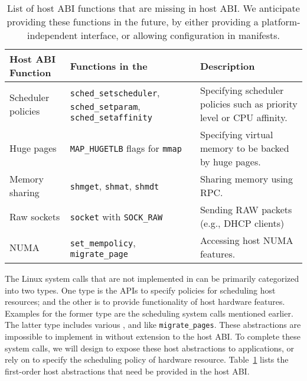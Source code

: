 \begin{table}[t]
\footnotesize
\centering
\begin{tabular}{|p{1.2in}|p{2.4in}|p{2.4in}|}
\hline
{\bf Host ABI Function} & {\bf Functions in the \libos{}} & {\bf Description} \\
\hline
Scheduler policies & {\tt sched\_setscheduler}, {\tt sched\_setparam}, {\tt sched\_setaffinity} & Specifying scheduler policies such as priority level or CPU affinity.\\
\hline
Huge pages & {\tt MAP\_HUGETLB} flags for {\tt mmap} & Specifying virtual memory to be backed by huge pages. \\
\hline
Memory sharing & {\tt shmget}, {\tt shmat}, {\tt shmdt} & Sharing memory using RPC. \\
\hline
Raw sockets & {\tt socket} with {\tt SOCK\_RAW}  & Sending RAW packets (e.g., DHCP clients) \\
\hline
NUMA & {\tt set\_mempolicy}, {\tt migrate\_page} & Accessing host NUMA features. \\
\hline
\end{tabular}
\caption[List of host ABI functions to be added in \graphene{} as future works]
{List of host ABI functions that are missing in \graphene{} host ABI.
We anticipate providing these functions in the future,
by either providing a platform-independent interface,
or allowing configuration in manifests.}
\label{tab:future:abi}
\end{table}


The Linux system calls that are not implemented in \graphene{}
can be primarily categorized into two types.
One type is the APIs
to specify policies for scheduling host resources;
and the other is to provide functionality of host hardware features.
Examples for the former type are the scheduling system calls mentioned earlier.
The latter type includes
various ,
and  like {\tt migrate\_pages}.
These abstractions are impossible to implement in \liboses{}
without extension to the host ABI.
To complete these system calls,
we will design  to expose these host abstractions
to applications,
or rely on 
to specify the scheduling policy of hardware resource.
Table~\ref{tab:future:abi} lists the first-order host abstractions
that need be provided in the \graphene{} host ABI.


